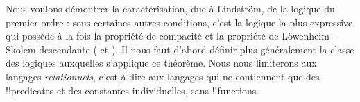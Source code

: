 \documentclass[../../../include/open-logic-section]{subfiles}
\begin{document}

Nous voulons démontrer la caractérisation,
due à Lindström, de la logique du premier
ordre : sous certaines autres conditions,
c'est la logique la plus expressive qui
possède à la fois la propriété de compacité
et la propriété de Löwenheim--Skolem
descendante
( et
).
Il nous faut d'abord définir plus
généralement la classe des logiques
auxquelles s'applique ce théorème.
Nous nous limiterons aux langages
\emph{relationnels}, c'est-à-dire
aux langages qui ne contiennent que
des !!{predicate}s et des constantes
individuelles, sans !!{function}s.
\end{document}
